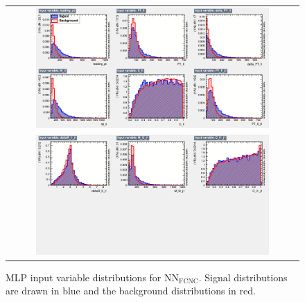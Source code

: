 \begin{figure}[ht]
  \begin{center}
    \begin{tabular}{c}
      \includegraphics[width=0.82\textwidth]{figures/tW/fig/MVA/MLP_FCNC/var_1.png}\\
      \includegraphics[width=0.82\textwidth]{figures/tW/fig/MVA/MLP_FCNC/var_2.png}\\
    \end{tabular}
    \caption{MLP input variable distributions for NN$_{\text{FCNC}}$. Signal distributions are drawn in blue and the background distributions in red.}
    \label{fig:input_var_FCNC}
  \end{center}
\end{figure}



